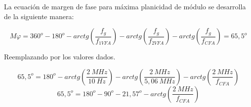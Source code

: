 \bigskip
\hspace{1mm} La ecuación de margen de fase para máxima planicidad de módulo se desarrolla de la siguiente manera:

\begin{equation}
    M \varphi = 360^o - 180^o - arctg \left(\frac{f_g}{f_{1VFA}}\right) - arctg \left(\frac{f_g}{f_{2VFA}}\right) - arctg \left(\frac{f_g}{f_{CFA}}\right) = 65,5^o
\end{equation}

\bigskip
\hspace{1mm} Reemplazando por los valores dados.

\begin{equation}
    65,5^o = 180^o - arctg \left(\frac{2~MHz}{10~Hz}\right) - arctg \left(\frac{2~MHz}{5,06~MHz}\right) - arctg \left(\frac{2~MHz}{f_{CFA}}\right)
\end{equation}
\begin{equation}
    65,5^o = 180^o - 90^o - 21,57^o - arctg \left(\frac{2~MHz}{f_{CFA}}\right)
\end{equation}

